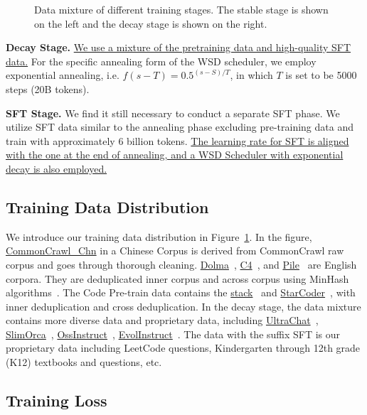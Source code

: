 \begin{figure}[htbp]
\begin{minipage}{0.48\linewidth}
    \end{minipage}
    \caption{Data mixture of different training stages. The stable stage is shown on the left and the decay stage is shown on the right.}
    \label{fig:appdatamixture}
\end{figure}

\textbf{Decay Stage.}
\uline{We use a mixture of the pretraining data and high-quality SFT data.} For the specific annealing form of the WSD scheduler, we employ exponential annealing, i.e. \uline{$f(s-T)=  0.5^{(s-S)/T}$}, in which $T$ is set to be 5000 steps (20B tokens).

\textbf{SFT Stage.} We find it still necessary to conduct a separate SFT phase. We utilize SFT data similar to the annealing phase excluding pre-training data and train with approximately 6 billion tokens. \uline{The learning rate for SFT is aligned with the one at the end of annealing, and a WSD Scheduler with exponential decay is also employed.}

\subsection{Training Data Distribution}
\label{sec:appdatadistrbution}

We introduce our training data distribution in Figure~\ref{fig:appdatamixture}. In the figure, \uline{CommonCrawl\_Chn} in a Chinese Corpus is derived from CommonCrawl raw corpus and goes through thorough cleaning. \uline{Dolma}~\citep{dolma}, \uline{C4}~\citep{2019t5}, and \uline{Pile}~\citep{gao2020pile, biderman2022datasheet} are English corpora. They are deduplicated inner corpus and across corpus using MinHash algorithms~\citep{broder1997resemblance}. The Code Pre-train data contains the \uline{stack}~\citep{Kocetkov2022TheStack} and \uline{StarCoder}~\cite{li2023starcoder}, with inner deduplication and cross deduplication. In the decay stage, the data mixture contains more diverse data and proprietary data, including \uline{UltraChat}~\citep{ding2023enhancing}, \uline{SlimOrca}~\citep{SlimOrca, SlimOrcaDedup}, \uline{OssInstruct}~\citep{wei2023magicoder}, \uline{EvolInstruct}~\citep{xu2023wizardlm}. The data with the suffix SFT is our proprietary data including LeetCode questions, Kindergarten through 12th grade (K12) textbooks and questions, etc. 

\subsection{Training Loss}

